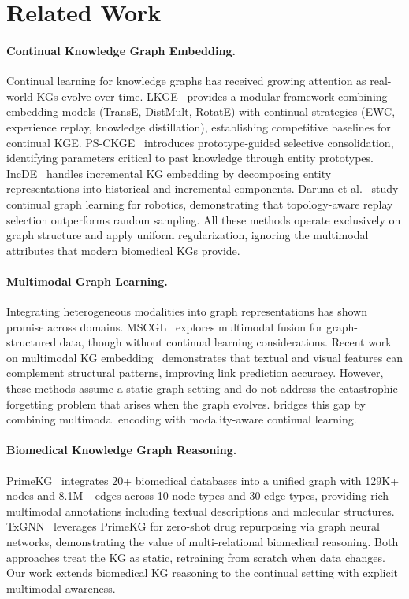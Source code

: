 \section{Related Work}
\label{sec:related}

\paragraph{Continual Knowledge Graph Embedding.}
Continual learning for knowledge graphs has received growing attention as real-world KGs evolve over time.
LKGE~\citep{cui2023lifelong} provides a modular framework combining embedding models (TransE, DistMult, RotatE) with continual strategies (EWC, experience replay, knowledge distillation), establishing competitive baselines for continual KGE.
PS-CKGE~\citep{wu2024ps} introduces prototype-guided selective consolidation, identifying parameters critical to past knowledge through entity prototypes.
IncDE~\citep{song2023incde} handles incremental KG embedding by decomposing entity representations into historical and incremental components.
Daruna et al.~\citep{daruna2021continual} study continual graph learning for robotics, demonstrating that topology-aware replay selection outperforms random sampling.
All these methods operate exclusively on graph structure and apply uniform regularization, ignoring the multimodal attributes that modern biomedical KGs provide.

\paragraph{Multimodal Graph Learning.}
Integrating heterogeneous modalities into graph representations has shown promise across domains.
MSCGL~\citep{liang2022foundations} explores multimodal fusion for graph-structured data, though without continual learning considerations.
Recent work on multimodal KG embedding~\citep{liang2022foundations} demonstrates that textual and visual features can complement structural patterns, improving link prediction accuracy.
However, these methods assume a static graph setting and do not address the catastrophic forgetting problem that arises when the graph evolves.
\ours bridges this gap by combining multimodal encoding with modality-aware continual learning.

\paragraph{Biomedical Knowledge Graph Reasoning.}
PrimeKG~\citep{chandak2023building} integrates 20+ biomedical databases into a unified graph with 129K+ nodes and 8.1M+ edges across 10 node types and 30 edge types, providing rich multimodal annotations including textual descriptions and molecular structures.
TxGNN~\citep{huang2024zero} leverages PrimeKG for zero-shot drug repurposing via graph neural networks, demonstrating the value of multi-relational biomedical reasoning.
Both approaches treat the KG as static, retraining from scratch when data changes.
Our work extends biomedical KG reasoning to the continual setting with explicit multimodal awareness.

